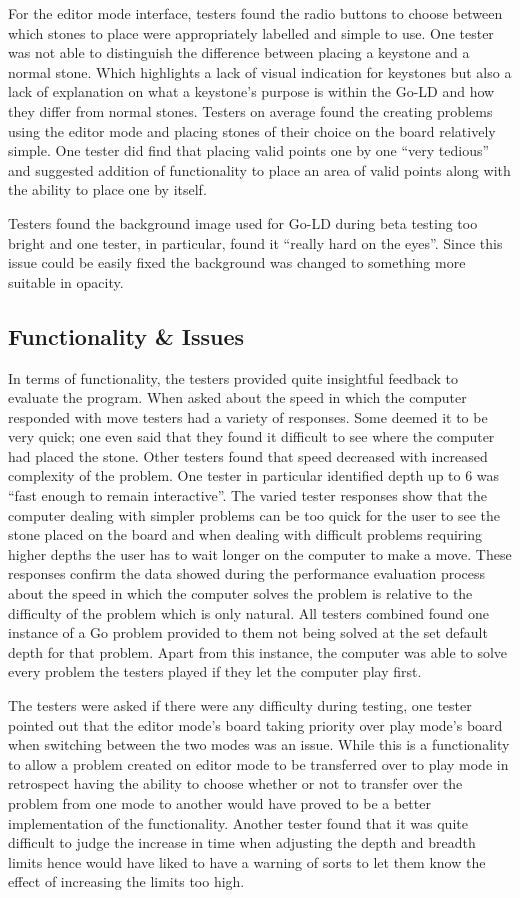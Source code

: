 \documentclass{l4proj}
\begin{document}
For the editor mode interface, testers found the radio buttons to choose between which stones to place were appropriately labelled and simple to use. One tester was not able to distinguish the difference between placing a keystone and a normal stone. Which highlights a lack of visual indication for keystones but also a lack of explanation on what a keystone’s purpose is within the Go-LD and how they differ from normal stones. Testers on average found the creating problems using the editor mode and placing stones of their choice on the board relatively simple. One tester did find that placing valid points one by one “very tedious” and suggested addition of functionality to place an area of valid points along with the ability to place one by itself.

Testers found the background image used for Go-LD during beta testing too bright and one tester, in particular, found it “really hard on the eyes”.  Since this issue could be easily fixed the background was changed to something more suitable in opacity.

\subsection{Functionality \& Issues}
In terms of functionality, the testers provided quite insightful feedback to evaluate the program. When asked about the speed in which the computer responded with move testers had a variety of responses. Some deemed it to be very quick; one even said that they found it difficult to see where the computer had placed the stone. Other testers found that speed decreased with increased complexity of the problem. One tester in particular identified depth up to 6 was “fast enough to remain interactive”. The varied tester responses show that the computer dealing with simpler problems can be too quick for the user to see the stone placed on the board and when dealing with difficult problems requiring higher depths the user has to wait longer on the computer to make a move. These responses confirm the data showed during the performance evaluation process about the speed in which the computer solves the problem is relative to the difficulty of the problem which is only natural.
All testers combined found one instance of a Go problem provided to them not being solved at the set default depth for that problem. Apart from this instance, the computer was able to solve every problem the testers played if they let the computer play first.

The testers were asked if there were any difficulty during testing, one tester pointed out that the editor mode’s board taking priority over play mode’s board when switching between the two modes was an issue. While this is a functionality to allow a problem created on editor mode to be transferred over to play mode in retrospect having the ability to choose whether or not to transfer over the problem from one mode to another would have proved to be a better implementation of the functionality. Another tester found that it was quite difficult to judge the increase in time when adjusting the depth and breadth limits hence would have liked to have a warning of sorts to let them know the effect of increasing the limits too high.
\end{document}
